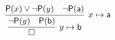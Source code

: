 \begin{gather*}
	\vspace{-1em}
\infer[x\mapsto \ma]{
	\infer[y\mapsto \mb]{\emptyclause}{
		\lnot\mP(y)&\mP(\mb)
		}
	}{\mP(x)\lor\lnot\mP(y)&\lnot\mP(\ma)
			}
			\end{gather*}